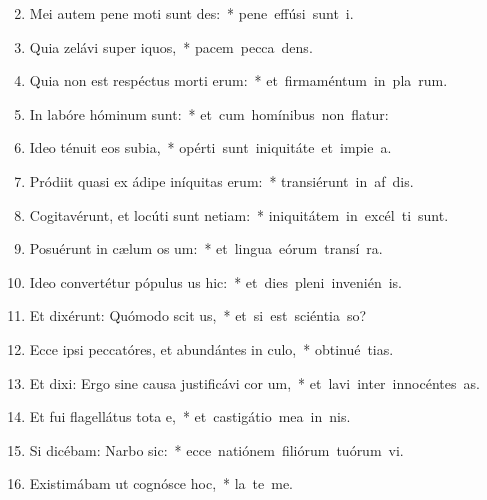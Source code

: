 \begin{flushleft}
\begin{enumerate}[leftmargin=*]
\setcounter{enumi}{1}

\item Mei autem pene moti sunt des:~* \mbox{pene effúsi sunt  i.}
\item Quia zelávi super iquos,~* \mbox{pacem pecca dens.}
\item Quia non est respéctus morti erum:~* \mbox{et firmaméntum in pla rum.}
\item In labóre hóminum  sunt:~* \mbox{et cum homínibus non flatur:}
\item Ideo ténuit eos subia,~* \mbox{opérti sunt iniquitáte et impie a.}
\item Pródiit quasi ex ádipe iníquitas erum:~* \mbox{transiérunt in af dis.}
\item Cogitavérunt, et locúti sunt netiam:~* \mbox{iniquitátem in excél ti sunt.}
\item Posuérunt in cælum os um:~* \mbox{et lingua eórum transí  ra.}
\item Ideo convertétur pópulus us hic:~* \mbox{et dies pleni invenién  is.}
\item Et dixérunt: Quómodo scit us,~* \mbox{et si est sciéntia  so?}
\item Ecce ipsi peccatóres, et abundántes in culo,~* \mbox{obtinué tias.}
\item Et dixi: Ergo sine causa justificávi cor um,~* \mbox{et lavi inter innocéntes  as.}
\item Et fui flagellátus tota e,~* \mbox{et castigátio mea in nis.}
\item Si dicébam: Narbo sic:~* \mbox{ecce natiónem filiórum tuórum vi.}
\item Existimábam ut cognósce hoc,~* \mbox{la  te me.}

\end{enumerate}
\end{flushleft}

